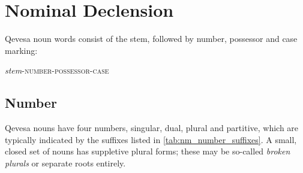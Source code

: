 \documentclass[grammar]{subfiles}
\begin{document}








\section{Nominal Declension}
\label{sec:nm_declension}

Qevesa noun words consist of the stem, followed by number, possessor and case marking:

\begin{exe}
  \ex\label{ex:nm_structure} \textit{stem}\textsc{-number-possessor-case}
\end{exe}


\subsection{Number}
\label{ssec:nm_number}

Qevesa nouns have four numbers, singular, dual, plural and partitive, which are
typically indicated by the suffixes listed in \cref{tab:nm_number_suffixes}.  A
small, closed set of nouns has suppletive plural forms; these may be so-called 
\emph{broken plurals} or separate roots entirely. 
\end{document}
